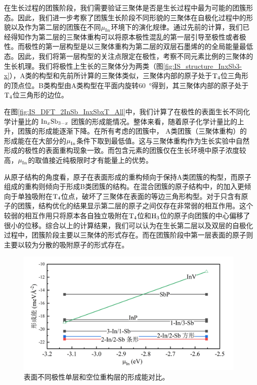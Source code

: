 在生长过程的团簇阶段，我们需要验证三聚体是否是生长过程中最为可能的团簇形态。因此，我们进一步考察了团簇生长阶段不同形貌的三聚体在自极化过程中的形貌以及作为第二层的团簇在不同$\it \mu_{\rm In}^{\rm } \it$环境下的演化规律。通过先前的计算，我们已经得知作为第二层的三聚体重构可以将原本极性混乱的第一层引导至极性或者极性。而极性的第一层构型是以三聚体重构为第二层的双层石墨烯的的全局能量最低态。因此，我们将第一层构型的关注点限定在极性，考察不同元素比例的三聚体的生长机理。我们将极性上生长的三聚体分为两类（图\ref{fig:IS_structure_InxSb3-x}），A类的构型和先前所计算的三聚体类似，三聚体内部的原子处于$\rm T_{4} \it$位三角形的顶点位。B类构型由A类构型在平面内旋转\SI{60}{\degree}得到，其三聚体内部的原子处于$\rm T_{4} \it$位三角形的边位。

在图\ref{fig:IS_DFT_2InSb_InxSbxT_All}中，我们计算了在极性的表面生长不同化学计量比的$\cemb{In_xSb_{3-x}}$团簇的形成能情况。整体来看，随着原子化学计量比的上升，团簇的形成能逐渐下降。在所有考虑的团簇中， A类团簇（三聚体重构）的形成能在在大部分的$\it \mu_{\rm In}^{\rm } \it$条件下取到最低值。这与三聚体重构作为生长实验中自然形成的极性的表面重构现象一致。而包含元素的团簇仅在生长环境中原子浓度较高，$\it \mu_{\rm In}^{\rm } \it$的取值接近纯极限时才有能量上的优势。

从原子结构的角度看，原子在表面形成的重构倾向于保持A类团簇的构型，而原子组成的重构则倾向于形成B类团簇的结构。在混合团簇的原子结构中，的加入更倾向于单独吸附在$\rm T_{4} \it$位点，破坏了三聚体在表面的等边三角形构型。对于只含有原子的团簇，结构优化的结果显示第二层的原子之间仅存在非常弱的相互作用。这个较弱的相互作用只将原本各自独立吸附在$\rm T_{4} \it$位和$\rm H_{3} \it$位的原子向团簇的中心偏移了很小的位移。综合以上的计算结果，我们可以认为在生长第二层以及双层的自极化过程中，团簇阶段主要以三聚体的形式存在。而在团簇阶段中第一层表面的原子则主要以较为分散的吸附原子的形式存在。

\begin{figure}[htb]
    \includegraphics{pic/IS_DFT_1InSb_FlipVsInV.png}
    \caption{表面不同极性单层和空位重构层的形成能对比。}
    \label{fig:IS_DFT_1InSb_FlipVsInV}
\end{figure}

